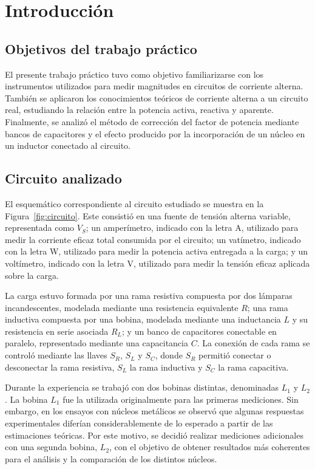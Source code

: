 \section{Introducción}

\subsection{Objetivos del trabajo práctico}

El presente trabajo práctico tuvo como objetivo familiarizarse con los instrumentos utilizados para medir magnitudes en circuitos de corriente alterna. También se aplicaron los conocimientos teóricos de corriente alterna a un circuito real, estudiando la relación entre la potencia activa, reactiva y aparente. Finalmente, se analizó el método de corrección del factor de potencia mediante bancos de capacitores y el efecto producido por la incorporación de un núcleo en un inductor conectado al circuito.

\subsection{Circuito analizado}

El esquemático correspondiente al circuito estudiado se muestra en la Figura~\ref{fig:circuito}. Este consistió en una fuente de tensión alterna variable, representada como $V_S$; un amperímetro, indicado con la letra A, utilizado para medir la corriente eficaz total consumida por el circuito; un vatímetro, indicado con la letra W, utilizado para medir la potencia activa entregada a la carga; y un voltímetro, indicado con la letra V, utilizado para medir la tensión eficaz aplicada sobre la carga.

La carga estuvo formada por una rama resistiva compuesta por dos lámparas incandescentes, modelada mediante una resistencia equivalente $R$; una rama inductiva compuesta por una bobina, modelada mediante una inductancia $L$ y su resistencia en serie asociada $R_L$; y un banco de capacitores conectable en paralelo, representado mediante una capacitancia $C$. La conexión de cada rama se controló mediante las llaves $S_R$, $S_L$ y $S_C$, donde $S_R$ permitió conectar o desconectar la rama resistiva, $S_L$ la rama inductiva y $S_C$ la rama capacitiva.


Durante la experiencia se trabajó con dos bobinas distintas, denominadas $L_1$ y $L_2$. La bobina $L_1$ fue la utilizada originalmente para las primeras mediciones. Sin embargo, en los ensayos con núcleos metálicos se observó que algunas respuestas experimentales diferían considerablemente de lo esperado a partir de las estimaciones teóricas. Por este motivo, se decidió realizar mediciones adicionales con una segunda bobina, $L_2$, con el objetivo de obtener resultados más coherentes para el análisis y la comparación de los distintos núcleos.

